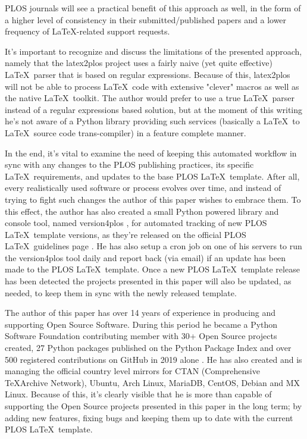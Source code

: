 PLOS journals will see a practical benefit of this approach as well, in the form of a higher level of consistency in their submitted/published papers and a lower frequency of \LaTeX-related support requests.

It's important to recognize and discuss the limitations of the presented approach, namely that the latex2plos project uses a fairly naive (yet quite effective) \LaTeX~parser that is based on regular expressions.
Because of this, latex2plos will not be able to process \LaTeX~code with extensive "clever" macros as well as the native \LaTeX~toolkit.
The author would prefer to use a true \LaTeX~parser instead of a regular expressions based solution, but at the moment of this writing he's not aware of a Python library providing such services (basically a \LaTeX~to \LaTeX~source code trans-compiler) in a feature complete manner.

In the end, it's vital to examine the need of keeping this automated workflow in sync with any changes to the PLOS publishing practices, its specific \LaTeX~requirements, and updates to the base PLOS \LaTeX~template.
After all, every realistically used software or process evolves over time, and instead of trying to fight such changes the author of this paper wishes to embrace them.
To this effect, the author has also created a small Python powered library and console tool, named version4plos \cite{version4plos}, for automated tracking of new PLOS \LaTeX~template versions, as they're released on the official PLOS \LaTeX~guidelines page \cite{PLOS:LaTeX}.
He has also setup a cron job on one of his servers to run the version4plos tool daily and report back (via email) if an update has been made to the PLOS \LaTeX~template.
Once a new PLOS \LaTeX~template release has been detected the projects presented in this paper will also be updated, as needed, to keep them in sync with the newly released template.

The author of this paper has over 14 years of experience in producing and supporting Open Source Software.
During this period he became a Python Software Foundation contributing member with 30+ Open Source projects created, 27 Python packages published on the Python Package Index and over 500 registered contributions on GitHub in 2019 alone \cite{Maric:GitHub, Maric:PyPI}.
He has also created and is managing the official country level mirrors for CTAN (Comprehensive \TeX Archive Network), Ubuntu, Arch Linux, MariaDB, CentOS, Debian and MX Linux.
Because of this, it's clearly visible that he is more than capable of supporting the Open Source projects presented in this paper in the long term; by adding new features, fixing bugs and keeping them up to date with the current PLOS \LaTeX~template.

